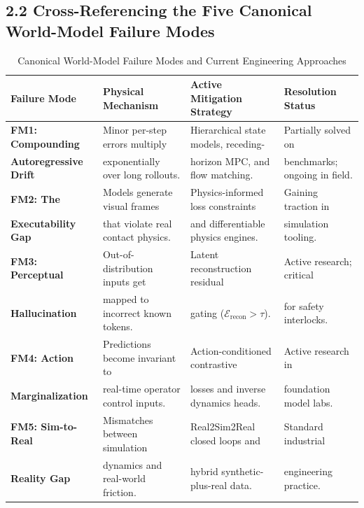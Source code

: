 \documentclass[11pt,a4paper]{article}
\begin{document}
\subsection{2.2 Cross-Referencing the Five Canonical World-Model Failure Modes}
\begin{table}[h!]
\centering
\small
\begin{tabularx}{\textwidth}{@{}l p{4.2cm} p{4.5cm} X@{}}
\toprule
\textbf{Failure Mode} & \textbf{Physical Mechanism} & \textbf{Active Mitigation Strategy} & \textbf{Resolution Status} \\
\midrule
\textbf{FM1: Compounding} & Minor per-step errors multiply & Hierarchical state models, receding- & Partially solved on \\
\textbf{Autoregressive Drift} & exponentially over long rollouts. & horizon MPC, and flow matching. & benchmarks; ongoing in field. \\
\addlinespace
\textbf{FM2: The} & Models generate visual frames & Physics-informed loss constraints & Gaining traction in \\
\textbf{Executability Gap} & that violate real contact physics. & and differentiable physics engines. & simulation tooling. \\
\addlinespace
\textbf{FM3: Perceptual} & Out-of-distribution inputs get & Latent reconstruction residual & Active research; critical \\
\textbf{Hallucination} & mapped to incorrect known tokens. & gating ($\mathcal{E}_{\text{recon}} > \tau$). & for safety interlocks. \\
\addlinespace
\textbf{FM4: Action} & Predictions become invariant to & Action-conditioned contrastive & Active research in \\
\textbf{Marginalization} & real-time operator control inputs. & losses and inverse dynamics heads. & foundation model labs. \\
\addlinespace
\textbf{FM5: Sim-to-Real} & Mismatches between simulation & Real2Sim2Real closed loops and & Standard industrial \\
\textbf{Reality Gap} & dynamics and real-world friction. & hybrid synthetic-plus-real data. & engineering practice. \\
\bottomrule
\end{tabularx}
\caption{Canonical World-Model Failure Modes and Current Engineering Approaches}
\end{table}
\end{document}
